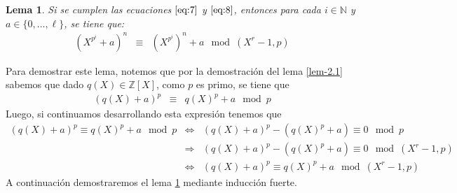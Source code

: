 \documentclass[10pt]{article}
\newcommand{\0}{\mathbf{0}}
\newcommand{\1}{\mathbf{1}}
\newcommand{\divi}{\hspace{1.8pt}|\hspace{1.8pt}}
\newcommand{\modulop}{\mod (X^r-1,p)}
\newcommand{\modl}{\mod}
\newcommand{\+}{\oplus}
\newcommand{\comentario}[1]{}
\newcommand{\comentarioin}[1]{}
\newtheorem{lemma}[theorem]{Lema}
\theoremstyle{remark}
\theoremstyle{remark}
\begin{document}
	\begin{lemma}\label{lema-b}
		Si se cumplen las ecuaciones $\eqref{eq:7}$ y $\eqref{eq:8}$, entonces para cada $i\in\mathbb{N}$ y $a \in \{0, \ldots, \ell\}$, se tiene que:
		\begin{eqnarray*}
			(X^{p^i}+a)^n&\equiv &(X^{p^i})^n + a \modulop
		\end{eqnarray*}
	\end{lemma} 
        Para demostrar este lema, notemos que por la demostración del lema \ref{lem-2.1} sabemos que dado $q(X)\in \mathbb{Z}[X]$, como $p$ es primo, se tiene que 
		\begin{eqnarray*}
			(q(X)+a)^p&\equiv &q(X)^p + a \modl p
		\end{eqnarray*}
		Luego, si continuamos desarrollando esta expresión tenemos que
		\begin{eqnarray}
			(q(X)+a)^p\equiv q(X)^p + a \modl p\nonumber & \Leftrightarrow & (q(X)+a)^p - (q(X)^p + a)\equiv 0 \modl p\nonumber\\
			& \Rightarrow & (q(X)+a)^p - (q(X)^p + a)\equiv 0 \modulop\nonumber\\
			& \Leftrightarrow & (q(X)+a)^p\equiv q(X)^p+a \modulop\label{eq:corolario2.1}
		\end{eqnarray}
	A continuación demostraremos el lema \ref{lema-b} mediante inducción fuerte.
\end{document}
